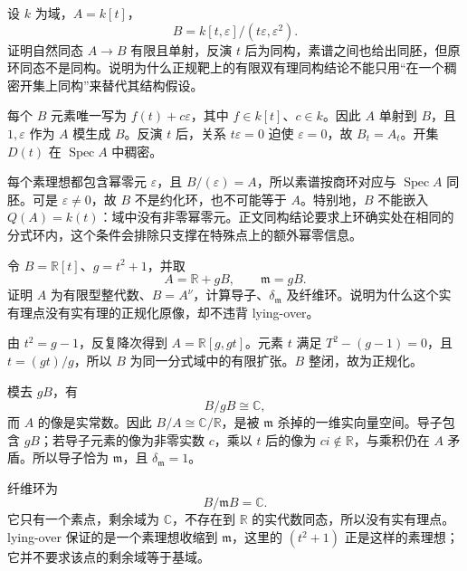 \begin{exercise}\label{g5:ex:nilpotent-finite-generic-isomorphism}
	设 \(k\) 为域，\(A=k[t]\)，
	\[
		B=k[t,\varepsilon]/(t\varepsilon,\varepsilon^2).
	\]
	证明自然同态 \(A\to B\) 有限且单射，反演 \(t\) 后为同构，素谱之间也给出同胚，但原环同态不是同构。说明为什么正规靶上的有限双有理同构结论不能只用“在一个稠密开集上同构”来替代其结构假设。
\end{exercise}
\begin{solution}
	每个 \(B\) 元素唯一写为 \(f(t)+c\varepsilon\)，其中 \(f\in k[t]\)、\(c\in k\)。因此 \(A\) 单射到 \(B\)，且 \(1,\varepsilon\) 作为 \(A\) 模生成 \(B\)。反演 \(t\) 后，关系 \(t\varepsilon=0\) 迫使 \(\varepsilon=0\)，故 \(B_t=A_t\)。开集 \(D(t)\) 在 \(\operatorname{Spec}A\) 中稠密。

	每个素理想都包含幂零元 \(\varepsilon\)，且 \(B/(\varepsilon)=A\)，所以素谱按商环对应与 \(\operatorname{Spec}A\) 同胚。可是 \(\varepsilon\ne0\)，故 \(B\) 不是约化环，也不可能等于 \(A\)。特别地，\(B\) 不能嵌入 \(Q(A)=k(t)\)：域中没有非零幂零元。正文同构结论要求上环确实处在相同的分式环内，这个条件会排除只支撑在特殊点上的额外幂零信息。
\end{solution}

\begin{exercise}\label{g5:ex:real-nonsplit-normalization-fiber}
	令 \(B=\mathbb R[t]\)、\(g=t^2+1\)，并取
	\[
		A=\mathbb R+gB,\qquad \mathfrak m=gB.
	\]
	证明 \(A\) 为有限型整代数、\(B=A^\nu\)，计算导子、\(\delta_{\mathfrak m}\) 及纤维环。说明为什么这个实有理点没有实有理的正规化原像，却不违背 lying-over。
\end{exercise}
\begin{solution}
	由 \(t^2=g-1\)，反复降次得到 \(A=\mathbb R[g,gt]\)。元素 \(t\) 满足 \(T^2-(g-1)=0\)，且 \(t=(gt)/g\)，所以 \(B\) 为同一分式域中的有限扩张。\(B\) 整闭，故为正规化。

	模去 \(gB\)，有
	\[
		B/gB\cong\mathbb C,
	\]
	而 \(A\) 的像是实常数。因此 \(B/A\cong\mathbb C/\mathbb R\)，是被 \(\mathfrak m\) 杀掉的一维实向量空间。导子包含 \(gB\)；若导子元素的像为非零实数 \(c\)，乘以 \(t\) 后的像为 \(ci\notin\mathbb R\)，与乘积仍在 \(A\) 矛盾。所以导子恰为 \(\mathfrak m\)，且 \(\delta_{\mathfrak m}=1\)。

	纤维环为
	\[
		B/\mathfrak mB=\mathbb C.
	\]
	它只有一个素点，剩余域为 \(\mathbb C\)，不存在到 \(\mathbb R\) 的实代数同态，所以没有实有理点。lying-over 保证的是一个素理想收缩到 \(\mathfrak m\)，这里的 \((t^2+1)\) 正是这样的素理想；它并不要求该点的剩余域等于基域。
\end{solution}

